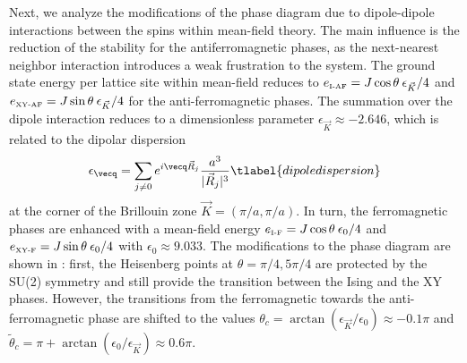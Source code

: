 Next, we analyze the modifications of the phase diagram due to dipole-dipole
interactions between the spins within mean-field theory. The
main influence is the reduction of the stability for the antiferromagnetic
phases, as the next-nearest neighbor interaction introduces a weak frustration
to the system. The ground state energy per lattice site within mean-field
reduces to $ e_{\mbox{\tiny I-AF}} = J \cos \theta \: \epsilon_{\vec K}/4$ and $e_{\mbox{\tiny XY-AF}} = J \sin \theta \: \epsilon_{\vec K}/4$
for the anti-ferromagnetic phases. The summation over the dipole interaction
reduces to a dimensionless parameter $\epsilon_{\vec K} \approx -2.646$, which is related to
the dipolar dispersion
%
\begin{align}
    \epsilon_{\vecq} = \sum_{j \neq 0} e^{i \vecq \vec{R}_{j} }\frac{a^3}{|{\vec R}_{j}|^3}
  \tlabel{dipoledispersion}
\end{align}
%
at the corner of the Brillouin zone ${\vec K} = (\pi/a, \pi /a)$.
In turn, the ferromagnetic phases are enhanced with a mean-field energy
$e_{\mbox{\tiny I-F}} = J \cos \theta \: \epsilon_0/4 $ and $ e_{\mbox{\tiny XY-F}} = J \sin \theta \: \epsilon_0/4$
with $\epsilon_{0} \approx 9.033$. The modifications to the
phase diagram are shown in : first, the Heisenberg points at
$\theta = \pi/4, 5 \pi/4$ are protected by the SU(2) symmetry and still
provide the transition between the Ising and the XY phases. However, the
transitions from the ferromagnetic towards the anti-ferromagnetic phase are
shifted to the values $\theta_{c}= \arctan(\epsilon_{\vec K}/\epsilon_{0})
\approx -0.1 \pi$ and $\tilde{\theta}_c = \pi+ \arctan(\epsilon_{0}/\epsilon_{\vec K})\approx 0.6 \pi$.




